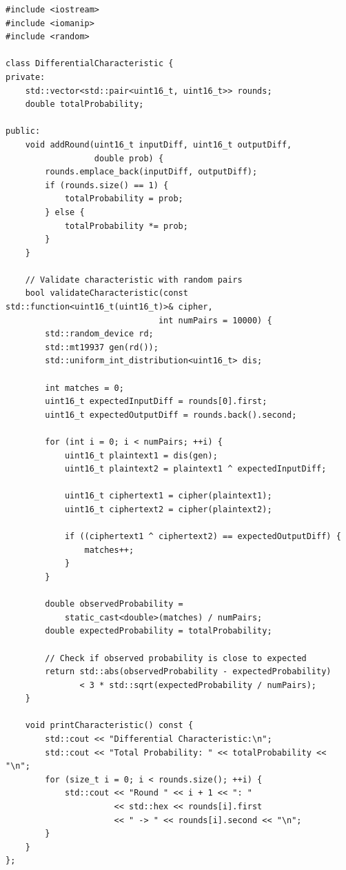 \documentclass[12pt,a4paper]{article}
\theoremstyle{definition}
\begin{document}
\begin{lstlisting}[style=cryptoCode, caption={Differential Characteristic Search and Validation}]
#include <iostream>
#include <iomanip>
#include <random>

class DifferentialCharacteristic {
private:
    std::vector<std::pair<uint16_t, uint16_t>> rounds;
    double totalProbability;
    
public:
    void addRound(uint16_t inputDiff, uint16_t outputDiff, 
                  double prob) {
        rounds.emplace_back(inputDiff, outputDiff);
        if (rounds.size() == 1) {
            totalProbability = prob;
        } else {
            totalProbability *= prob;
        }
    }
    
    // Validate characteristic with random pairs
    bool validateCharacteristic(const std::function<uint16_t(uint16_t)>& cipher,
                               int numPairs = 10000) {
        std::random_device rd;
        std::mt19937 gen(rd());
        std::uniform_int_distribution<uint16_t> dis;
        
        int matches = 0;
        uint16_t expectedInputDiff = rounds[0].first;
        uint16_t expectedOutputDiff = rounds.back().second;
        
        for (int i = 0; i < numPairs; ++i) {
            uint16_t plaintext1 = dis(gen);
            uint16_t plaintext2 = plaintext1 ^ expectedInputDiff;
            
            uint16_t ciphertext1 = cipher(plaintext1);
            uint16_t ciphertext2 = cipher(plaintext2);
            
            if ((ciphertext1 ^ ciphertext2) == expectedOutputDiff) {
                matches++;
            }
        }
        
        double observedProbability = 
            static_cast<double>(matches) / numPairs;
        double expectedProbability = totalProbability;
        
        // Check if observed probability is close to expected
        return std::abs(observedProbability - expectedProbability) 
               < 3 * std::sqrt(expectedProbability / numPairs);
    }
    
    void printCharacteristic() const {
        std::cout << "Differential Characteristic:\n";
        std::cout << "Total Probability: " << totalProbability << "\n";
        for (size_t i = 0; i < rounds.size(); ++i) {
            std::cout << "Round " << i + 1 << ": " 
                      << std::hex << rounds[i].first 
                      << " -> " << rounds[i].second << "\n";
        }
    }
};
\end{lstlisting}
\end{document}
